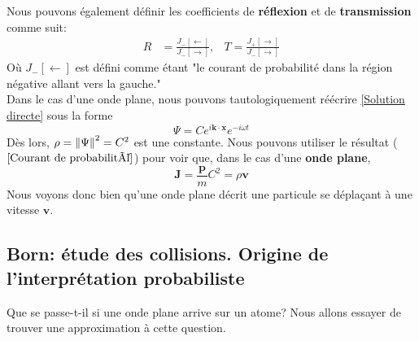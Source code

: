 \documentclass[../notesdecours]{subfiles}
\begin{document}
Nous pouvons également définir les coefficients de \textbf{réflexion} et de \textbf{transmission} comme suit:
\begin{align}
R &= \frac{J_- [\leftarrow]}{J_- [\rightarrow]},	&T = \frac{J_+ [\rightarrow]}{J_- [\rightarrow]}
\end{align}
Où $J_- [\leftarrow]$ est défini comme étant "le courant de probabilité dans la région négative allant vers la gauche."\\

Dans le cas d'une onde plane, nous pouvons tautologiquement réécrire \eqref{Solution directe} sous la forme
\begin{equation}
\label{One plane forme}
\Psi = Ce^{i \bm{k} \cdot \bm{x}} e^{-i \omega t}
\end{equation}
Dès lors, $\rho = \norm{\Psi}^2 = C^2$ est une constante. Nous pouvons utiliser le résultat ($\ref{Courant de probabilité}$) pour voir que, dans le cas d'une \textbf{onde plane}, 
\begin{equation}
\bm{J} = \frac{\bm{p}}{m} C^2 = \rho\bm{v}
\end{equation}
Nous voyons donc bien qu'une onde plane décrit une particule se déplaçant à une vitesse $\bm{v}$.
\subsection{Born: étude des collisions. Origine de l'interprétation probabiliste}
Que se passe-t-il si une onde plane arrive sur un atome? Nous allons essayer de trouver une approximation à cette question.\\
\end{document}
